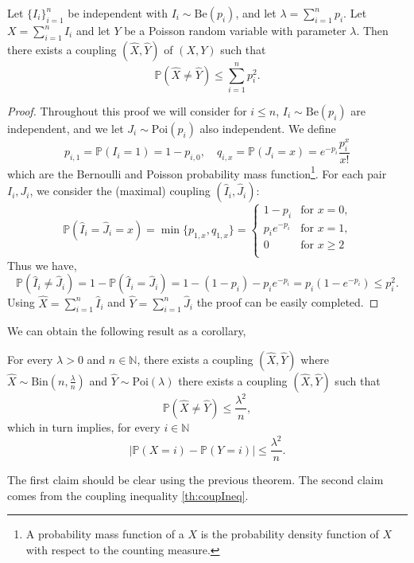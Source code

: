 \begin{theorem}
	Let $\{I_i\}_{i=1}^n$ be independent with $I_i \sim \text{Be}(p_i)$, and let $\lambda = \sum_{i=1}^n p_i$.
	Let $X = \sum_{i=1}^n I_i$ and let $Y$ be a Poisson random variable with parameter $\lambda$.
	Then there exists a coupling $(\hat{X}, \hat{Y})$ of $(X, Y)$ such that
	\begin{equation}
		\mathbb{P}(\hat{X} \neq \hat{Y}) \leq \sum_{i=1}^n p_i^2.
	\end{equation}
\end{theorem}
\begin{proof}
	Throughout this proof we will consider for $i\leq n$,  $I_i \sim \text{Be}(p_i)$ are independent, and we let $J_i \sim \text{Poi}(p_i)$ also independent.
	We define
	\begin{equation}
		p_{i,1} = \mathbb{P}(I_i = 1) = 1-p_{i,0}, \quad q_{i,x} = \mathbb{P}(J_i = x) = e^{-p_i}\frac{p_i^x}{x!}
	\end{equation}
	which are the Bernoulli and Poisson probability mass function\footnote{A probability mass function of a $X$ is the probability density function of $X$ with respect to the counting measure.}.
	\newline
	For each pair $I_i, J_i$, we consider the (maximal) coupling $(\hat{I}_i, \hat{J}_i)$:
	\begin{equation}
		\mathbb{P}(\hat{I}_i = \hat{J}_i =x) = \min\{p_{1,x}, q_{1, x}\} = \left\{	\begin{array}{rl}
												1-p_i  &\text{for $x = 0$,}\\
												p_ie^{-p_i} &\text{for $x= 1$,}\\
												0 &\text{for $x\geq 2$}\\
											\end{array}
										\right.
	\end{equation}
	Thus we have,
	\begin{equation}
		\mathbb{P}(\hat{I}_i \neq \hat{J}_i) = 1 - \mathbb{P}(\hat{I}_i = \hat{J}_i) = 1 - (1-p_i) - p_ie^{-p_i} = p_i(1-e^{-p_i}) \leq p_i^2.
	\end{equation}
	Using $\hat{X} = \sum_{i=1}^n \hat{I}_i$ and $\hat{Y} = \sum_{i=1}^n \hat{J}_i$ the proof can be easily completed.
\end{proof}
We can obtain the following result as a corollary,
\begin{corollary}\label{th:poiIneqCoup}
	For every $\lambda > 0$ and $n\in \mathbb{N}$, there exists a coupling $(\hat{X}, \hat{Y})$ where $\hat{X} \sim \text{Bin}(n, \frac{\lambda}{n})$ and 
	$\hat{Y} \sim \text{Poi}(\lambda)$ there exists a coupling $(\hat{X}, \hat{Y})$ such that 
	\begin{equation}
		\mathbb{P}(\hat{X} \neq \hat{Y}) \leq \frac{\lambda^2}{n},
	\end{equation}
which in turn implies, for every $i\in \mathbb{N}$
	\begin{equation}
		|\mathbb{P}(X = i) - \mathbb{P}(Y=i)| \leq \frac{\lambda^2}{n}.
	\end{equation}
\end{corollary}
The first claim should be clear using the previous theorem. The second claim comes from the coupling inequality \ref{th:coupIneq}.
